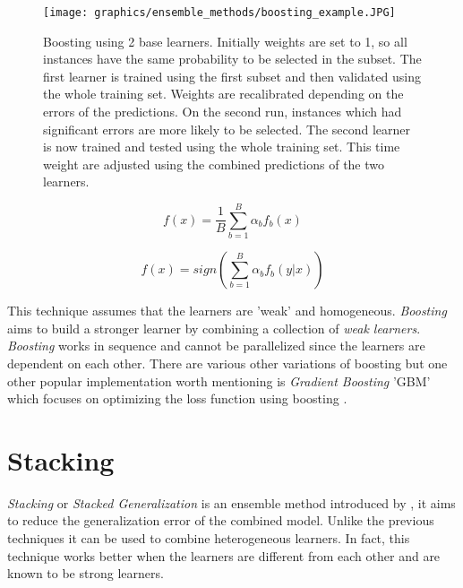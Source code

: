 \begin{figure}
  \texttt{[image: graphics/ensemble\_methods/boosting\_example.JPG]}
  \caption{
     Boosting using 2 base learners. Initially weights are set to 1, so all instances have the same probability to be selected in the subset. The first learner is trained using the first subset and then validated using the whole training set. Weights are recalibrated depending on the errors of the predictions. On the second run, instances which had significant errors are more likely to be selected. The second learner is now trained and tested using the whole training set. This time weight are adjusted using the combined predictions of the two learners.  
  }
  \label{fig:boostingexample}
\end{figure}

\begin{equation}\label{eq:boostinggmean}
    f(x) = \frac{1}{B} \sum_{b=1}^{B} \alpha_b f_b(x)
\end{equation}

\begin{equation}\label{eq:boostingvote}
    f(x) = sign (\sum_{b=1}^{B} \alpha_b f_b(y | x))
\end{equation}

This technique assumes that the learners are 'weak' and homogeneous. \textit{Boosting} aims to build a stronger learner by combining a collection of \textit{weak learners}. \textit{Boosting} works in sequence and cannot be parallelized since the learners are dependent on each other. There are various other variations of boosting but one other popular implementation worth mentioning is \textit{Gradient Boosting} 'GBM' which focuses on optimizing the loss function using boosting \citep{breiman1997arcing}. 

\section{Stacking}
\textit{Stacking} or \textit{Stacked Generalization} is an ensemble method introduced by \citet{wolpert1992stacked}, it aims to reduce the generalization error of the combined model. Unlike the previous techniques it can be used to combine heterogeneous learners. In fact, this technique works better when the learners are different from each other and are known to be strong learners.  

